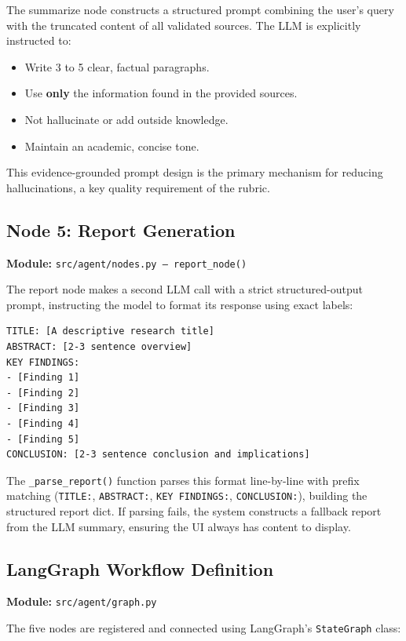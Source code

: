 \documentclass[12pt, a4paper]{article}
\begin{document}
The summarize node constructs a structured prompt combining the user's query with the truncated content of all validated sources. The LLM is explicitly instructed to:
\begin{itemize}
  \item Write 3 to 5 clear, factual paragraphs.
  \item Use \textbf{only} the information found in the provided sources.
  \item Not hallucinate or add outside knowledge.
  \item Maintain an academic, concise tone.
\end{itemize}

This evidence-grounded prompt design is the primary mechanism for reducing hallucinations, a key quality requirement of the rubric.

\subsection{Node 5: Report Generation}

\textbf{Module:} \texttt{src/agent/nodes.py -- report\_node()}

The report node makes a second LLM call with a strict structured-output prompt, instructing the model to format its response using exact labels:
\begin{lstlisting}[language={}, caption=Structured Report Prompt Template]
TITLE: [A descriptive research title]
ABSTRACT: [2-3 sentence overview]
KEY FINDINGS:
- [Finding 1]
- [Finding 2]
- [Finding 3]
- [Finding 4]
- [Finding 5]
CONCLUSION: [2-3 sentence conclusion and implications]
\end{lstlisting}

The \texttt{\_parse\_report()} function parses this format line-by-line with prefix matching (\texttt{TITLE:}, \texttt{ABSTRACT:}, \texttt{KEY FINDINGS:}, \texttt{CONCLUSION:}), building the structured report dict. If parsing fails, the system constructs a fallback report from the LLM summary, ensuring the UI always has content to display.

\subsection{LangGraph Workflow Definition}

\textbf{Module:} \texttt{src/agent/graph.py}

The five nodes are registered and connected using LangGraph's \texttt{StateGraph} class:
\end{document}
